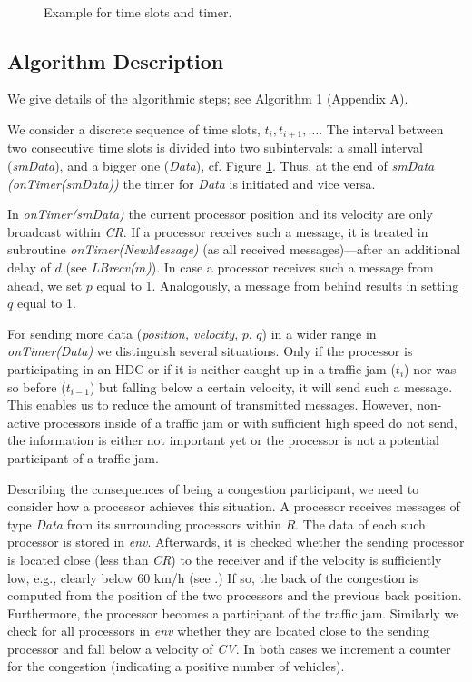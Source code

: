 \documentclass{acmrip}
\begin{document}
\begin{figure}[tp]
\centering
{}\\
\caption{\label{time}\small Example for time slots and timer. }
\end{figure}






\subsection{Algorithm Description}
We give details of the algorithmic steps; see Algorithm 1 (Appendix
A).

We consider a discrete sequence of time slots, $t_i, t_{i+1},
\ldots$. The interval between two consecutive time slots is divided
into two subintervals: a small interval ({\em {smData}}), and a bigger
one ({\em Data}), cf. Figure \ref{time}. Thus, at the end of {\em
smData (onTimer(smData))} the timer for {\em Data} is initiated and
vice versa.


In {\em onTimer(smData)} the current processor position and its
velocity are only broadcast within {\em CR}. If a processor receives such a
message, it is treated in subroutine {\em onTimer(NewMessage)} (as
all received
messages)---after an additional delay of $d$ (see {\em LBrecv($m$)}). In case a processor receives such a message from ahead, we set
$p$ equal to 1. Analogously, a message from behind results in
setting $q$ equal to 1.

For sending more data ({\em position, velocity}, $p$, $q$) in a
wider range in {\em onTimer(Data)} we distinguish several
situations. Only if the processor is participating in an HDC or if it
is neither caught up in a traffic jam ($t_i$) nor was so before
($t_{i-1}$) but falling below a certain velocity, it will send such
a message. This enables us to reduce the amount of transmitted
messages. However, non-active processors inside of a traffic jam or
with sufficient high speed do not send, the information is either
not important yet or the processor is not a potential participant of
a traffic jam.

Describing the consequences of being a congestion participant, we
need to consider how a processor achieves this situation. A
processor receives messages of type \textit{Data} from its
surrounding processors within $R$. The data of each such processor
is stored in \textit{env}. Afterwards, it is checked whether the
sending processor is located close (less than {\em CR}) to the receiver
and if the velocity is sufficiently low, e.g., clearly below 60 km/h
(see \cite{brilon05,k-mmtfi-97}.) If so, the back of the congestion
is computed from
the position of the two processors and the previous back position.
Furthermore, the processor becomes a participant of the traffic jam.
Similarly we check for all processors in \textit{env} whether they
are located close to the sending processor and fall below a velocity
of {\em CV}. In both cases we increment a counter for the congestion
(indicating a positive number of vehicles).
\end{document}
